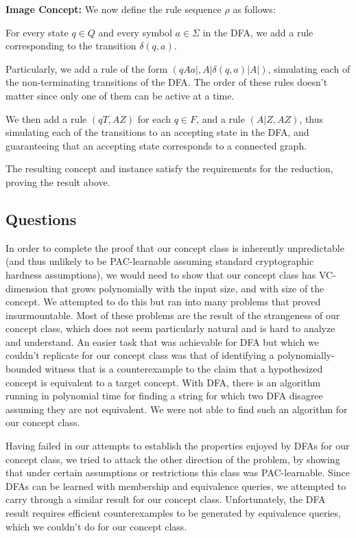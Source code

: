 \documentclass[]{article}
\begin{document}
\textbf{Image Concept:}
We now define the rule sequence $\rho$ as follows:

For every state $q\in Q$ and every symbol $a\in \Sigma$ in the DFA, we add a rule corresponding to the transition $\delta(q,a)$.

Particularly, we add a rule of the form $(qAa|, A|\delta(q,a)|A|)$, simulating
each of the non-terminating transitions of the DFA. The order of
these rules doesn't matter since only one of them can be active at a time.

We then add a rule $(qT, AZ)$ for each $q\in F$, and a rule $(A|Z,AZ)$, thus
simulating each of the transitions to an accepting state in the DFA, and
guaranteeing that an accepting state corresponds to a connected graph.

The resulting concept and instance satisfy the requirements for the reduction,
proving the result above.

\subsection{Questions}

In order to complete the proof that our concept class is inherently
unpredictable (and thus unlikely to be PAC-learnable assuming standard
cryptographic hardness assumptions), we would need to show that our concept
class has VC-dimension that grows polynomially with the input size, and with
size of the concept. We attempted to do this but ran into many problems that
proved insurmountable. Most of these problems are the result of the strangeness
of our concept class, which does not seem particularly natural and is hard to
analyze and understand. An easier task that was achievable for DFA but which we
couldn't replicate for our concept class was that of identifying a
polynomially-bounded witness that is a counterexample to the claim that a
hypothesized concept is equivalent to a target concept. With DFA, there is an
algorithm running in polynomial time for finding a string for which two DFA
disagree assuming they are not equivalent. We were not able to find such an
algorithm for our concept class.

Having failed in our attempts to establish the properties enjoyed by DFAs for
our concept class, we tried to attack the other direction of the problem, by
showing that under certain assumptions or restrictions this class was
PAC-learnable. Since DFAs can be learned with membership and
equivalence queries, we attempted to carry 
through a similar result for our concept class. Unfortunately, the DFA result
requires efficient counterexamples to be generated by equivalence queries, which
we couldn't do for our concept class.
\end{document}
